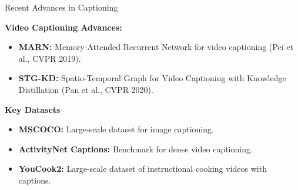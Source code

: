 \begin{frame}[allowframebreaks]{Recent Advances in Captioning}
\begin{itemize}
        \end{itemize}
    \vspace{0.5em}
    \textbf{Video Captioning Advances:}
        \begin{itemize}
            \item \textbf{MARN:} Memory-Attended Recurrent Network for video captioning (Pei et al., CVPR 2019).
            \item \textbf{STG-KD:} Spatio-Temporal Graph for Video Captioning with Knowledge Distillation (Pan et al., CVPR 2020).
        \end{itemize}
\framebreak
    \textbf{Key Datasets}
        \begin{itemize}
            \item \textbf{MSCOCO:} Large-scale dataset for image captioning.
            \item \textbf{ActivityNet Captions:} Benchmark for dense video captioning.
            \item \textbf{YouCook2:} Large-scale dataset of instructional cooking videos with captions.
        \end{itemize}
\end{frame}

